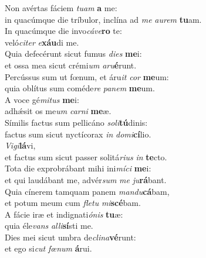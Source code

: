 \evenverse Non avértas fáciem \textit{tu}\textit{am} \textbf{a} me:~\*\\
\evenverse in quacúmque die tríbulor, inclína ad \textit{me} \textit{au}\textit{rem} \textbf{tu}am.\\
\oddverse In quacúmque die invo\textit{cá}\textit{ve}\textbf{ro} te:~\*\\
\oddverse veló\textit{ci}\textit{ter} \textit{e}\textbf{xáu}di me.\\
\evenverse Quia defecérunt sicut fumus \textit{di}\textit{es} \textbf{me}i:~\*\\
\evenverse et ossa mea sicut crémi\textit{um} \textit{a}\textit{ru}\textbf{é}runt.\\
\oddverse Percússus sum ut fœnum, et áru\textit{it} \textit{cor} \textbf{me}um:~\*\\
\oddverse quia oblítus sum coméde\textit{re} \textit{pa}\textit{nem} \textbf{me}um.\\
\evenverse A voce gé\textit{mi}\textit{tus} \textbf{me}i:~\*\\
\evenverse adhǽsit os me\textit{um} \textit{car}\textit{ni} \textbf{me}æ.\\
\oddverse Símilis factus sum pellicáno \textit{so}\textit{li}\textbf{tú}dinis:~\*\\
\oddverse factus sum sicut nyctícorax \textit{in} \textit{do}\textit{mi}\textbf{cí}lio.\\
\evenverse \textit{Vi}\textit{gi}\textbf{lá}vi,~\*\\
\evenverse et factus sum sicut passer solitá\textit{ri}\textit{us} \textit{in} \textbf{te}cto.\\
\oddverse Tota die exprobrábant mihi ini\textit{mí}\textit{ci} \textbf{me}i:~\*\\
\oddverse et qui laudábant me, advér\textit{sum} \textit{me} \textit{ju}\textbf{rá}bant.\\
\evenverse Quia cínerem tamquam panem \textit{man}\textit{du}\textbf{cá}bam,~\*\\
\evenverse et potum meum cum \textit{fle}\textit{tu} \textit{mi}\textbf{scé}bam.\\
\oddverse A fácie iræ et indignati\textit{ó}\textit{nis} \textbf{tu}æ:~\*\\
\oddverse quia éle\textit{vans} \textit{al}\textit{li}\textbf{sí}sti me.\\
\evenverse Dies mei sicut umbra de\textit{cli}\textit{na}\textbf{vé}runt:~\*\\
\evenverse et ego si\textit{cut} \textit{fœ}\textit{num} \textbf{á}rui.\\
